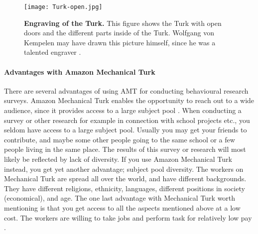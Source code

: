 \begin{figure}[h!]
\centering
\texttt{[image: Turk-open.jpg]}
\caption[Engraving of the Turk]{\textbf{Engraving of the Turk.} This figure shows the Turk with open doors and the different parts inside of the Turk. Wolfgang von Kempelen may have drawn this picture himself, since he was a talented engraver \cite{theturk}.}
\end{figure}

\paragraph{Advantages with Amazon Mechanical Turk}
There are several advantages of using AMT for conducting behavioural research surveys. Amazon Mechanical Turk enables the opportunity to reach out to a wide audience, since it provides access to a large subject pool \cite{AMT}. When conducting a survey or other research for example in connection with school projects etc., you seldom have access to a large subject pool. Usually you may get your friends to contribute, and maybe some other people going to the same school or a few people living in the same place. The results of this survey or research will most likely be reflected by lack of diversity. If you use Amazon Mechanical Turk instead, you get yet another advantage; subject pool diversity. The workers on Mechanical Turk are spread all over the world, and have different backgrounds. They have different religions, ethnicity, languages, different positions in society (economical), and age. The one last advantage with Mechanical Turk worth mentioning is that you get access to all the aspects mentioned above at a low cost. The workers are willing to take jobs and perform task for relatively low pay \cite{AMT}.

